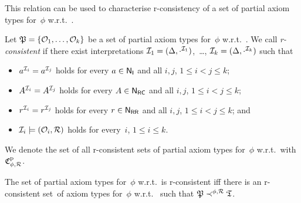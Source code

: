 \noindent
This relation can be used to characterise r-consistency of a set of partial
axiom types for~$\phi$ w.r.t.~\Rmc.

\begin{definition}
    Let $\mathfrak{P}=\{\mathcal{O}_1,\dots,\mathcal{O}_k\}$ be a set of partial axiom types
    for~$\phi$ w.r.t.~\Rmc.  We call \Pmf \emph{r-consistent} if there exist
    interpretations $\mathcal{I}_1=(\Delta,\cdot^{\mathcal{I}_1})$,~\dots,
    $\mathcal{I}_k=(\Delta,\cdot^{\mathcal{I}_k})$ such that
    \begin{itemize}
        \item $a^{\mathcal{I}_i}=a^{\mathcal{I}_j}$ holds for every $a\in\mathsf{N_I}$ and all $i,j$,
            $1\le i<j\le k$;
        \item $A^{\mathcal{I}_i}=A^{\mathcal{I}_j}$ holds for every $A\in\mathsf{N_{RC}}$ and all $i,j$,
            $1\le i<j\le k$;
        \item $r^{\mathcal{I}_i}=r^{\mathcal{I}_j}$ holds for every $r\in\mathsf{N_{RR}}$ and all $i,j$,
            $1\le i<j\le k$; and
        \item $\mathcal{I}_i\models(\mathcal{O}_i,\mathcal{R})$ holds for every~$i$, $1\le i\le k$.
    \end{itemize}
\end{definition}

\noindent
We denote the set of all r-consistent sets of partial axiom types for~$\phi$
w.r.t.~\Rmc with~$\mathfrak{C}_{\phi,\mathcal{R}}^\text{p}$.

\begin{lemma}\label{lem:r-cons-partial}
    The set \Pmf of partial axiom types for~$\phi$ w.r.t.~\Rmc is r-consistent
    iff there is an r-consistent set~\Tmf of axiom types for~$\phi$ w.r.t.~\Rmc
    such that $\mathfrak{P}\prec^{\phi,\mathcal{R}}\mathfrak{T}$.
\end{lemma}

